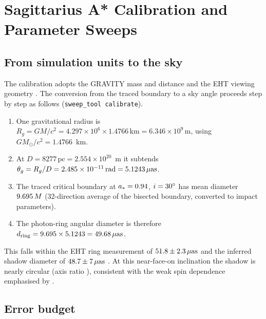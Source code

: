 \chapter{Sagittarius A* Calibration and Parameter Sweeps}
\label{ch:calib}

\section{From simulation units to the sky}
\label{sec:conversion}

The \sgra{} calibration adopts the GRAVITY mass and distance
\citep{Gravity2022} and the EHT viewing geometry
\citep[$i \approx 30\degr$;][]{EHT2022}. The conversion from the traced
boundary to a sky angle proceeds step by step as follows
(\texttt{sweep\_tool calibrate}).
\begin{enumerate}
\item One gravitational radius is
$R_g = GM/c^2 = 4.297\times10^{6} \times 1.4766\,\mathrm{km}
     = 6.346\times10^{9}\,\mathrm{m}$,
using $GM_\odot/c^2 = 1.4766$~km.
\item At $D = 8277\,\mathrm{pc} = 2.554\times10^{20}$~m it subtends
$\theta_g = R_g/D = 2.485\times10^{-11}\,\mathrm{rad}
 = 5.1243\,\mu\mathrm{as}$.
\item The traced critical boundary at $a_* = 0.94$, $i = 30^\circ$ has
mean diameter $9.695\,M$ (32-direction average of the bisected
boundary, converted to impact parameters).
\item The photon-ring angular diameter is therefore
$d_{\rm ring} = 9.695 \times 5.1243 = 49.68\,\mu\mathrm{as}$.
\end{enumerate}
This falls within the EHT ring measurement of $51.8\pm2.3\,\mu\mathrm{as}$ and the
inferred shadow diameter of $48.7\pm7\,\mu\mathrm{as}$ \citep{EHT2022}. At this
near-face-on inclination the shadow is nearly circular (axis ratio
\CalAxisRatio), consistent with the weak spin dependence emphasised by
\citet{Psaltis2016}.

\section{Error budget}
\label{sec:errorbudget}

